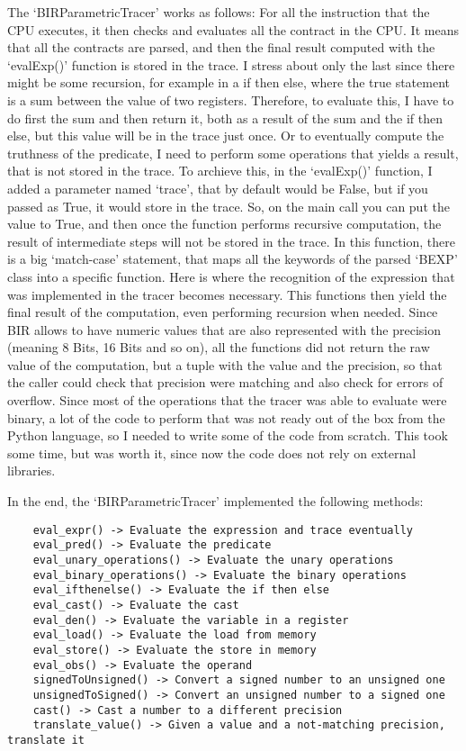 The `BIRParametricTracer' works as follows: For all the instruction that the CPU
executes, it then checks and evaluates all the contract in the CPU. It means
that all the contracts are parsed, and then the final result computed with the `evalExp()'
function is stored in the trace. I stress about only the last since there might
be some recursion, for example in a if then else, where the true statement is a
sum between the value of two registers. Therefore, to evaluate this, I have to do
first the sum and then return it, both as a result of the sum and the if then
else, but this value will be in the trace just once. Or to eventually compute
the truthness of the predicate, I need to perform some operations that yields a result,
that is not stored in the trace. To archieve this, in the `evalExp()' function, I
added a parameter named `trace', that by default would be False, but if you passed
as True, it would store in the trace. So, on the main call you can put the value
to True, and then once the function performs recursive computation, the result
of intermediate steps will not be stored in the trace. In this function, there
is a big `match-case' statement, that maps all the keywords of the parsed `BEXP'
class into a specific function. Here is where the recognition of the expression
that was implemented in the tracer becomes necessary. This functions then yield the
final result of the computation, even performing recursion when needed. Since BIR
allows to have numeric values that are also represented with the precision (meaning
8 Bits, 16 Bits and so on), all the functions did not return the raw value of the
computation, but a tuple with the value and the precision, so that the caller could
check that precision were matching and also check for errors of overflow. Since
most of the operations that the tracer was able to evaluate were binary, a lot of
the code to perform that was not ready out of the box from the Python language,
so I needed to write some of the code from scratch. This took some time, but was
worth it, since now the code does not rely on external libraries.

In the end, the `BIRParametricTracer' implemented the following methods: \begin{verbatim}
    eval_expr() -> Evaluate the expression and trace eventually
    eval_pred() -> Evaluate the predicate
    eval_unary_operations() -> Evaluate the unary operations 
    eval_binary_operations() -> Evaluate the binary operations
    eval_ifthenelse() -> Evaluate the if then else
    eval_cast() -> Evaluate the cast
    eval_den() -> Evaluate the variable in a register
    eval_load() -> Evaluate the load from memory
    eval_store() -> Evaluate the store in memory
    eval_obs() -> Evaluate the operand
    signedToUnsigned() -> Convert a signed number to an unsigned one
    unsignedToSigned() -> Convert an unsigned number to a signed one
    cast() -> Cast a number to a different precision
    translate_value() -> Given a value and a not-matching precision, translate it
\end{verbatim}

